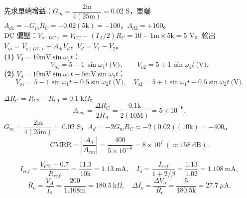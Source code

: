 \documentclass[12pt]{article}
\begin{document}
\sol 先求單端增益：$G_m=\dfrac{2\text{m}}{4(25\text{m})}=0.02$ S，單端 $A_{d1}=-G_mR_C=-0.02(5\text{k})=-100$，$A_{d2}=+100$。\\
DC 偏壓：$V_{o(DC)}=V_{CC}-(I_A/2)R_C=10-1\text{m}\times5\text{k}=5$ V。輸出 $V_{oi}=V_{o(DC)}+A_{di}V_d$，$V_d=V_1-V_2$。\\
\textbf{(1)} $V_d=10\text{mV}\sin\omega_1t$：
\[ V_{o1}=5-1\,\sin\omega_1t\ \text{(V)},\qquad V_{o2}=5+1\,\sin\omega_1t\ \text{(V)}. \]
\textbf{(2)} $V_d=10\text{mV}\sin\omega_1t-5\text{mV}\sin\omega_2t$：
\[ V_{o1}=5-1\sin\omega_1t+0.5\sin\omega_2t\ \text{(V)},\quad
   V_{o2}=5+1\sin\omega_1t-0.5\sin\omega_2t\ \text{(V)}. \]

\sol $\Delta R_C=R_{C2}-R_{C1}=0.1$ k$\Omega$。
\[ A_{cm}=\frac{\Delta R_C}{2R_A}=\frac{0.1\text{k}}{2(10\text{M})}=5\times10^{-6}. \]
$G_m=\dfrac{2\text{m}}{4(25\text{m})}=0.02$ S，$A_d=-2G_mR_C\approx-2(0.02)(10\text{k})=-400$。
\[ \mathrm{CMRR}=\left|\frac{A_d}{A_{cm}}\right|=\frac{400}{5\times10^{-6}}=8\times10^{7}\ (\approx158\ \text{dB}). \]

\begin{minipage}{0.64\linewidth}
\end{minipage}\hfill
\begin{minipage}{0.33\linewidth}
\end{minipage}

\sol
\[ I_{ref}=\frac{V_{CC}-0.7}{R_{ref}}=\frac{11.3}{10\text{k}}=1.13\ \text{mA},\quad
   I_o=\frac{I_{ref}}{1+2/\beta}=\frac{1.13}{1.02}=1.108\ \text{mA}, \]
\[ R_o=\frac{V_A}{I_o}=\frac{200}{1.108\text{m}}=180.5\ \text{k}\Omega,\quad
   \Delta I_o=\frac{\Delta V_o}{R_o}=\frac{5}{180.5\text{k}}=27.7\ \mu\text{A}. \]
\end{document}

